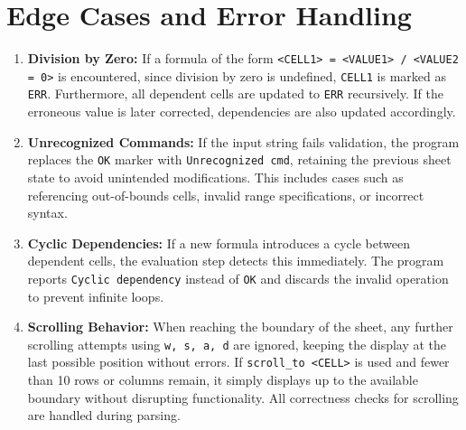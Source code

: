 \documentclass{report}
\begin{document}
\section*{Edge Cases and Error Handling}
\begin{enumerate}
    \item 	\textbf{Division by Zero:} If a formula of the form \texttt{<CELL1> = <VALUE1> / <VALUE2 = 0>} is encountered, since division by zero is undefined, \texttt{CELL1} is marked as \texttt{ERR}. Furthermore, all dependent cells are updated to \texttt{ERR} recursively. If the erroneous value is later corrected, dependencies are also updated accordingly.
    
    \item 	\textbf{Unrecognized Commands:} If the input string fails validation, the program replaces the \texttt{OK} marker with \texttt{Unrecognized cmd}, retaining the previous sheet state to avoid unintended modifications. This includes cases such as referencing out-of-bounds cells, invalid range specifications, or incorrect syntax.
    
    \item 	\textbf{Cyclic Dependencies:} If a new formula introduces a cycle between dependent cells, the evaluation step detects this immediately. The program reports \texttt{Cyclic dependency} instead of \texttt{OK} and discards the invalid operation to prevent infinite loops.
    
    \item 	\textbf{Scrolling Behavior:} When reaching the boundary of the sheet, any further scrolling attempts using \texttt{w, s, a, d} are ignored, keeping the display at the last possible position without errors. If \texttt{scroll\_to <CELL>} is used and fewer than 10 rows or columns remain, it simply displays up to the available boundary without disrupting functionality. All correctness checks for scrolling are handled during parsing.
\end{enumerate}
\end{document}
